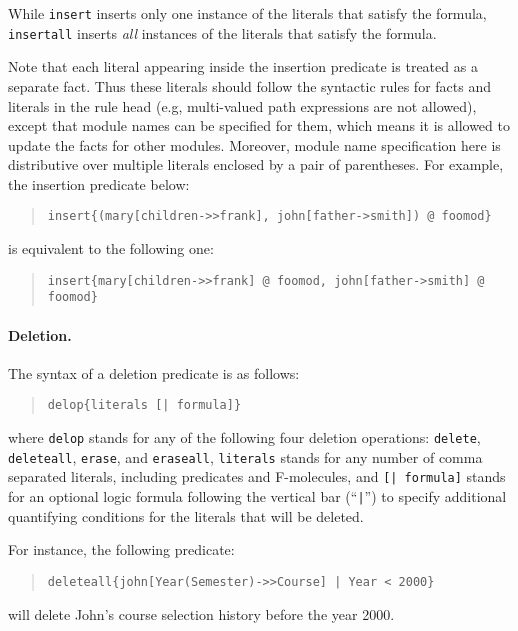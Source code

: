 \documentclass[11pt]{article}
\begin{document}
While {\tt insert} inserts only one instance of the literals that
satisfy the formula, {\tt insertall} inserts \emph{all} instances
of the literals that satisfy the formula.

Note that each literal appearing inside the insertion predicate is
treated as a separate fact. Thus these literals should follow the
syntactic rules for facts and literals in the rule head (e.g,
multi-valued path expressions are not allowed), except that module
names can be specified for them, which means it is allowed to update
the facts for other modules. Moreover, module name specification here
is distributive over multiple literals enclosed by a pair of
parentheses. For example, the insertion predicate below:
\begin{quote}
\begin{verbatim}
insert{(mary[children->>frank], john[father->smith]) @ foomod}
\end{verbatim}
\end{quote}
is equivalent to the following one:
\begin{quote}
\verb|insert{mary[children->>frank] @ foomod, john[father->smith] @ foomod}|
\end{quote}


%
\paragraph{Deletion.} The syntax of a deletion predicate is as follows:
\begin{quote}
\begin{verbatim}
delop{literals [| formula]}
\end{verbatim}
\end{quote}
where {\tt delop} stands for any of the following four deletion
operations: {\tt delete}, {\tt deleteall}, {\tt erase}, and
{\tt eraseall}, {\tt literals} stands for any number of comma
separated literals, including predicates and \mbox{F-molecules},
and {\tt [| formula]} stands for an optional logic formula following
the vertical bar (``{\tt |}'') to specify additional quantifying
conditions for the literals that will be deleted.

For instance, the following predicate:
\begin{quote}
\begin{verbatim}
deleteall{john[Year(Semester)->>Course] | Year < 2000}
\end{verbatim}
\end{quote}
will delete John's course selection history before the year
2000.
\end{document}
